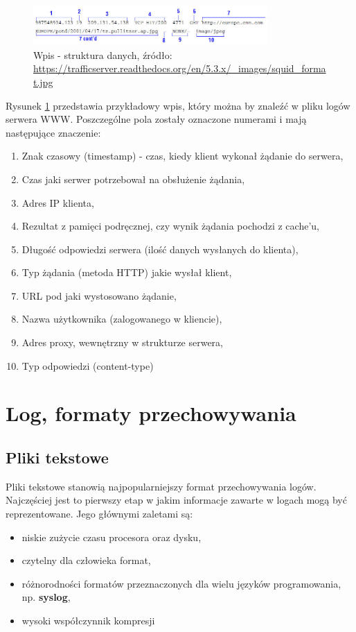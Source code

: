     \begin{figure}[H]
        \centering
        \includegraphics[width=0.80\textwidth]{images/log_data_structure}
        \caption[Wpis w logu jako struktura danych]{
            Wpis - struktura danych, źródło: \url{https://trafficserver.readthedocs.org/en/5.3.x/_images/squid_format.jpg}
        }
        \label{chapter:logs:history:log_as_data_structure_picture}
    \end{figure}
    
    Rysunek \ref{chapter:logs:history:log_as_data_structure_picture} przedstawia przykładowy wpis, który można by znaleźć
    w pliku logów serwera WWW. Poszczególne pola zostały oznaczone numerami i mają następujące znaczenie:
    \begin{enumerate}
        \item Znak czasowy (timestamp) - czas, kiedy klient wykonał żądanie do serwera,
        \item Czas jaki serwer potrzebował na obsłużenie żądania,
        \item Adres IP klienta,
        \item Rezultat z pamięci podręcznej, czy wynik żądania pochodzi z cache'u,
        \item Długość odpowiedzi serwera (ilość danych wysłanych do klienta),
        \item Typ żądania (metoda HTTP) jakie wysłał klient,
        \item URL pod jaki wystosowano żądanie,
        \item Nazwa użytkownika (zalogowanego w kliencie),
        \item Adres proxy, wewnętrzny w strukturze serwera,
        \item Typ odpowiedzi (content-type)
    \end{enumerate}
    
\section{Log, formaty przechowywania}

    \subsection{Pliki tekstowe}
    Pliki tekstowe stanowią najpopularniejszy format przechowywania logów. Najczęściej jest to 
    pierwszy etap w jakim informacje zawarte w logach mogą być reprezentowane. Jego głównymi zaletami są:
    \begin{itemize}
        \item niskie zużycie czasu procesora oraz dysku,
        \item czytelny dla człowieka format,
        \item różnorodności formatów przeznaczonych dla wielu języków programowania, np. \textbf{syslog},
        \item wysoki współczynnik kompresji \cite{logging_log_management}
    \end{itemize}
    
